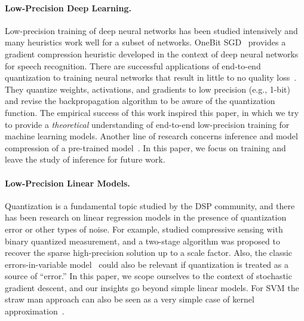 \documentclass{article}
\begin{document}
\vspace{-0.5em}
\paragraph{Low-Precision Deep Learning.}

Low-precision training of deep neural networks has been studied
intensively and many heuristics work well for a subset of networks.
OneBit SGD~\cite{Frank:2014:Interspeech} provides
a gradient compression heuristic developed in the context of deep 
neural networks for speech recognition. There are successful 
applications of end-to-end quantization to training neural networks that 
result in little to no quality loss~\cite{hubara2016quantized,
rastegari2016xnor,zhou2016dorefa,miyashita2016convolutional,li2016ternary,gupta2015deep}. They quantize weights, activations, and gradients 
to low precision (e.g., 1-bit) and revise the backpropagation 
algorithm to be aware of the quantization function.
The empirical success of this work inspired this paper, in which we try
to provide a {\em theoretical} understanding of end-to-end low-precision
training for machine learning models.
Another line of research concerns inference and model
compression of a pre-trained model~\cite{vanhoucke2011improving,gong2014compressing,Han:2016:ICLR,lin2016fixed,kim2016bitwise,kim2015compression,wu2016quantized}.
In this paper, we focus on training and leave the study of
inference for future work.

\vspace{-0.5em}
\paragraph{Low-Precision Linear Models.}

Quantization is a fundamental topic studied by the
DSP community, and there has been research on
linear regression models in the presence of quantization
error or other types of noise. For example,
\citet{Gopi:2013:ICML} studied compressive sensing
with binary quantized measurement, and a two-stage algorithm was proposed to recover the sparse high-precision solution up to a scale factor.
Also, the
classic errors-in-variable model~\cite{Hall:2008:Book}
could also be relevant if quantization is treated 
as a source of ``error.'' In this paper, we scope
ourselves to the context of stochastic gradient descent, 
and our insights go beyond simple linear models.
For SVM the straw man approach 
can also be seen as a very simple case of kernel 
approximation~\cite{Cortes:2010:AISTATS}.
\end{document}

